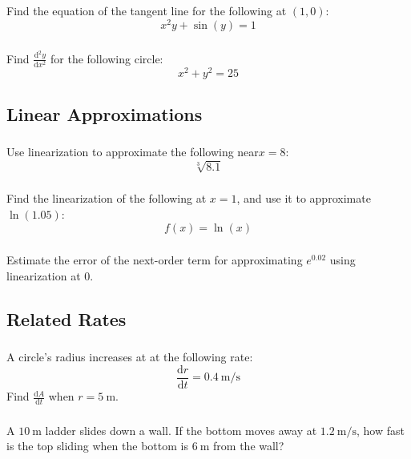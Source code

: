 \documentclass[12pt]{article}
\newcommand{\dd}{\text{d}}
\begin{document}
			\subsubsection{}
				Find the equation of the tangent line for the following at \((1,0)\):
				\[x^2y+\sin\left(y\right)=1\]
			\subsubsection{}
				Find \(\frac{\dd^2 y}{\dd x^2}\) for the following circle:
				\[x^2+y^2=25\]

		\subsection{Linear Approximations}
			\subsubsection{}
				Use linearization to approximate the following near\(x=8\):
				\[\sqrt[3]{8.1}\]
			\subsubsection{}
				Find the linearization of the following at \(x=1\), and use it to approximate \(\ln(1.05)\):
				\[f(x)=\ln\left(x\right)\]
			\subsubsection{}
				Estimate the error of the next-order term for approximating \(e^{0.02}\) using linearization at 0.

		\subsection{Related Rates}
			\subsubsection{}
				A circle's radius increases at at the following rate:
				\[\frac{\dd r}{\dd t}=\qty{0.4}{\meter\per\second}\]
				Find \(\frac{\dd A}{\dd t}\) when \(r=\qty{5}{\meter}\).
			\subsubsection{}
				A \(\qty{10}{\meter}\) ladder slides down a wall. If the bottom moves away at \(\qty{1.2}{\meter\per\second}\), how fast is the top sliding when the bottom is \(\qty{6}{\meter}\) from the wall?
\end{document}
